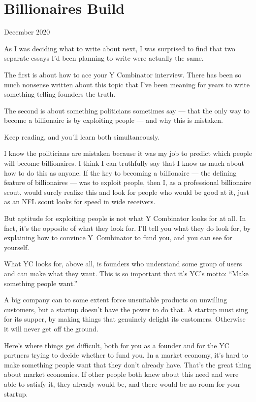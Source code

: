 \documentclass[12pt]{book}
\begin{document}
\chapter{Billionaires Build}

December 2020

As I was deciding what to write about next, I was surprised to find that
two separate essays I'd been planning to write were actually the same.

The first is about how to ace your Y Combinator interview. There has
been so much nonsense written about this topic that I've been meaning
for years to write something telling founders the truth.

The second is about something politicians sometimes say --- that the
only way to become a billionaire is by exploiting people --- and why
this is mistaken.

Keep reading, and you'll learn both simultaneously.

I know the politicians are mistaken because it was my job to predict
which people will become billionaires. I think I can truthfully say that
I know as much about how to do this as anyone. If the key to becoming a
billionaire --- the defining feature of billionaires --- was to exploit
people, then I, as a professional billionaire scout, would surely
realize this and look for people who would be good at it, just as an NFL
scout looks for speed in wide receivers.

But aptitude for exploiting people is not what Y Combinator looks for at
all. In fact, it's the opposite of what they look for. I'll tell you
what they do look for, by explaining how to convince Y~Combinator to
fund you, and you can see for yourself.

What YC looks for, above all, is founders who understand some group of
users and can make what they want. This is so important that it's YC's
motto: ``Make something people want.''

A big company can to some extent force unsuitable products on unwilling
customers, but a startup doesn't have the power to do that. A startup
must sing for its supper, by making things that genuinely delight its
customers. Otherwise it will never get off the ground.

Here's where things get difficult, both for you as a founder and for the
YC partners trying to decide whether to fund you. In a market economy,
it's hard to make something people want that they don't already have.
That's the great thing about market economies. If other people both knew
about this need and were able to satisfy it, they already would be, and
there would be no room for your startup.
\end{document}
